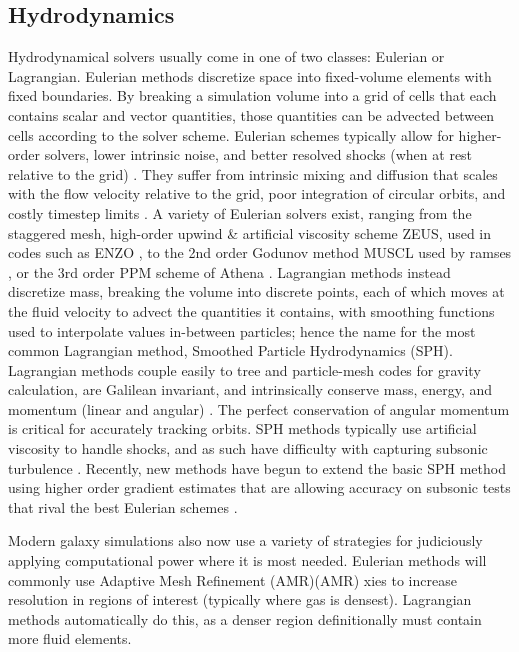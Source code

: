 \subsection{Hydrodynamics}
Hydrodynamical solvers usually come in one of two classes: Eulerian or
Lagrangian.  Eulerian methods discretize space into fixed-volume elements with
fixed boundaries.  By breaking a simulation volume into a grid of cells that
each contains scalar and vector quantities, those quantities can be advected
between cells according to the solver scheme.  Eulerian schemes typically allow
for higher-order solvers, lower intrinsic noise, and better resolved shocks
(when at rest relative to the grid) \citep{Teyssier2002,Stone2008,Bryan2014}.
They suffer from intrinsic mixing and diffusion that scales with the flow
velocity relative to the grid, poor integration of circular orbits, and costly
timestep limits \citep{Agertz2007,Tasker2008}.  A variety of Eulerian solvers
exist, ranging from the staggered mesh, high-order upwind \& artificial
viscosity scheme ZEUS, used in codes such as {\sc ENZO}
\citep{Stone1999,Bryan2014}, to the 2nd order Godunov method MUSCL used by {\sc
ramses} \citep{vanLeer1976,Teyssier2002}, or the 3rd order PPM scheme of {\sc
Athena} \citep{Stone2008}.  Lagrangian methods instead discretize mass, breaking
the volume into discrete points, each of which moves at the fluid
velocity to advect the quantities it contains, with smoothing functions used to
interpolate values in-between particles; hence the name for the most common
Lagrangian method, Smoothed Particle Hydrodynamics (SPH).  Lagrangian methods
couple easily to tree and particle-mesh codes for gravity calculation, are
Galilean invariant, and intrinsically conserve mass, energy, and momentum
(linear and angular) \citep{Katz1996,Wadsley2004,Springel2005}.  The perfect
conservation of angular momentum is critical for accurately tracking orbits. SPH
methods typically use artificial viscosity to handle shocks, and as such have
difficulty with capturing subsonic turbulence \citep{Bauer2012}.  Recently, new
methods have begun to extend the basic SPH method using higher order gradient
estimates that are allowing accuracy on subsonic tests that rival the best
Eulerian schemes \citep{Springel2010,Hopkins2015,Valdarnini2016}. 

Modern galaxy simulations also now use a variety of strategies for judiciously
applying computational power where it is most needed.  Eulerian methods will
commonly use Adaptive Mesh Refinement (AMR)(AMR)  xies to increase resolution in
regions of interest (typically where gas is densest).  Lagrangian methods
automatically do this, as a denser region definitionally must contain more fluid
elements.  

